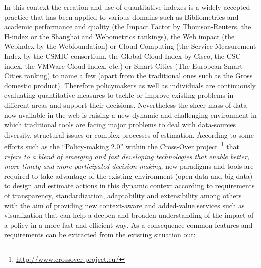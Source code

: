 In this context the creation and use of quantitative indexes is a widely accepted practice that has been applied to various 
domains such as Bibliometrics and academic performance and quality (the Impact Factor by Thomson-Reuters, the H-index or the Shanghai and Webometrics rankings), 
the Web impact (the Webindex by the Webfoundation) or Cloud Computing (the Service Measurement Index by the CSMIC consortium, the Global Cloud Index by Cisco, 
the CSC index, the VMWare Cloud Index, etc.) or Smart Cities (The European Smart Cities ranking) to name a few (apart from the traditional ones such as the Gross domestic product). 
Therefore policymakers as well as individuals are continuously evaluating quantitative measures to tackle or improve 
existing problems in different areas and support their decisions. Nevertheless the sheer mass of data now available in the web is 
raising a new dynamic and challenging environment in which traditional tools are facing major 
problems to deal with data-sources diversity, structural issues or complex processes of estimation. According to some efforts 
such as the ``Policy-making $2.0$'' within the Cross-Over project~\footnote{\url{http://www.crossover-project.eu/}} that \textit{refers to a blend of emerging and fast developing technologies 
that enable better, more timely and more participated decision-making}, new paradigms and tools are required to take advantage of 
the existing environment (open data and big data) to design and estimate actions in this dynamic context according to requirements of 
transparency, standardization, adaptability and extensibility among others with the aim of providing new context-aware 
and added-value services such as visualization that can help a deepen and broaden understanding of the impact of a 
policy in a more fast and efficient way. As a consequence common features and requirements can be extracted from the existing situation out:
